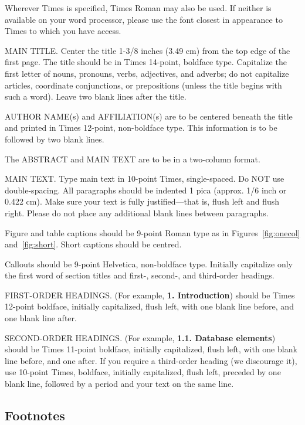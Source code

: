 \documentclass[10pt,twocolumn,letterpaper]{article}
\begin{document}
Wherever Times is specified, Times Roman may also be used. If neither is
available on your word processor, please use the font closest in
appearance to Times to which you have access.

MAIN TITLE. Center the title 1-3/8 inches (3.49 cm) from the top edge of
the first page. The title should be in Times 14-point, boldface type.
Capitalize the first letter of nouns, pronouns, verbs, adjectives, and
adverbs; do not capitalize articles, coordinate conjunctions, or
prepositions (unless the title begins with such a word). Leave two blank
lines after the title.

AUTHOR NAME(s) and AFFILIATION(s) are to be centered beneath the title
and printed in Times 12-point, non-boldface type. This information is to
be followed by two blank lines.

The ABSTRACT and MAIN TEXT are to be in a two-column format.

MAIN TEXT. Type main text in 10-point Times, single-spaced. Do NOT use
double-spacing. All paragraphs should be indented 1 pica (approx. 1/6
inch or 0.422 cm). Make sure your text is fully justified---that is,
flush left and flush right. Please do not place any additional blank
lines between paragraphs.

Figure and table captions should be 9-point Roman type as in
Figures~\ref{fig:onecol} and~\ref{fig:short}.  Short captions should be centred.

\noindent Callouts should be 9-point Helvetica, non-boldface type.
Initially capitalize only the first word of section titles and first-,
second-, and third-order headings.

FIRST-ORDER HEADINGS. (For example, {\large \bf 1. Introduction})
should be Times 12-point boldface, initially capitalized, flush left,
with one blank line before, and one blank line after.

SECOND-ORDER HEADINGS. (For example, { \bf 1.1. Database elements})
should be Times 11-point boldface, initially capitalized, flush left,
with one blank line before, and one after. If you require a third-order
heading (we discourage it), use 10-point Times, boldface, initially
capitalized, flush left, preceded by one blank line, followed by a period
and your text on the same line.

\subsection{Footnotes}
\end{document}
